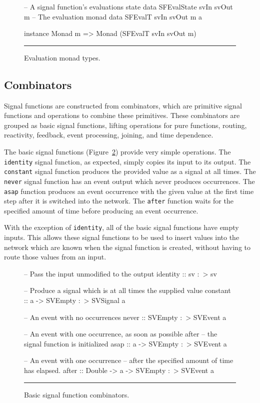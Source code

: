\documentclass[draft]{llncs}
\begin{document}
\begin{figure}
\begin{code}
-- A signal function's evaluations state
data SFEvalState svIn svOut m
-- The evaluation monad
data SFEvalT svIn svOut m a

instance Monad m => Monad (SFEvalT svIn svOut m)
\end{code}
\hrule
\caption{Evaluation monad types.}
\label{figure:evaluation_monad_types}
\end{figure}

\subsection{Combinators}
\label{section:System_Design_and_Interface-Combinators}

Signal functions are constructed from combinators, which are primitive signal
functions and operations to combine these primitives. These combinators are
grouped as basic signal functions, lifting operations for pure functions,
routing, reactivity, feedback, event processing, joining, and time dependence.

The basic signal functions (Figure~\ref{figure:basic_signal_functions})
provide very simple operations. The {\tt identity} signal function, as expected,
simply copies its input to its output. The {\tt constant} signal function
produces the provided value as a signal at all times. The {\tt never} signal
function has an event output which never produces occurrences. The {\tt asap}
function produces an event occurrence with the given value at the first time
step after it is switched into the network. The {\tt after} function waits for
the specified amount of time before producing an event occurrence.

With the exception of {\tt identity}, all of the basic signal functions have
empty inputs. This allows these signal functions to be used to insert values
into the network which are known when the signal function is created, without
having to route those values from an input.

\begin{figure}
\begin{code}
-- Pass the input unmodified to the output
identity :: sv :~> sv

-- Produce a signal which is at all times the supplied value
constant :: a -> SVEmpty :~> SVSignal a

-- An event with no occurrences
never    :: SVEmpty :~> SVEvent a

-- An event with one occurrence, as soon as possible after
-- the signal function is initialized
asap     :: a -> SVEmpty :~> SVEvent a

-- An event with one occurrence
-- after the specified amount of time has elapsed.
after    :: Double -> a -> SVEmpty :~> SVEvent a
\end{code}
\hrule
\caption{Basic signal function combinators.}
\label{figure:basic_signal_functions}
\end{figure}
\end{document}
